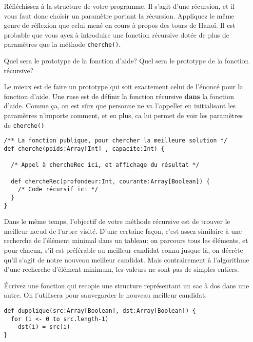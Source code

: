 \documentclass[10pt]{article}\usepackage[correction,nu]{esial}
\begin{document}
\medskip Réfléchissez à la structure de votre programme. Il s'agit d'une
récursion, et il vous faut donc choisir un paramètre portant la
récursion. Appliquez le même genre de réflexion que celui mené en cours à
propos des tours de Hanoï. Il est probable que vous ayez à introduire une
fonction récursive dotée de plus de paramètres que la méthode
\texttt{cherche()}.

\Question Quel sera le prototype de la fonction d'aide? Quel sera le prototype
de la fonction récursive?

\begin{Reponse}
  Le mieux est de faire un prototype qui soit exactement celui de l'énoncé pour
  la fonction d'aide. Une ruse est de définir la fonction récursive
  \textbf{dans} la fonction d'aide. Comme ça, on est sûrs que personne ne va
  l'appeller en initialisant les paramètres n'importe comment, et en plus, ca
  lui permet de voir les paramètres de \texttt{cherche()}
  \begin{Verbatim}
/** La fonction publique, pour chercher la meilleure solution */
def cherche(poids:Array[Int] , capacite:Int) {

  /* Appel à chercheRec ici, et affichage du résultat */
  
  def chercheRec(profondeur:Int, courante:Array[Boolean]) {
    /* Code récursif ici */
  }
}    
  \end{Verbatim}
\end{Reponse}

\medskip Dans le même temps, l'objectif de votre méthode récursive est de
trouver le meilleur nœud de l'arbre visité. D'une certaine façon, c'est assez
similaire à une recherche de l'élément minimal dans un tableau: on parcours tous
les éléments, et pour chacun, s'il est préférable au meilleur candidat connu
jusque là, on décrète qu'il s'agit de notre nouveau meilleur candidat. Mais
contrairement à l'algorithme d'une recherche d'élément minimum, les valeurs ne
sont pas de simples entiers. 

\Question Écrivez une fonction qui recopie une structure représentant un sac à
dos dans une autre. On l'utilisera pour sauvegarder le nouveau meilleur
candidat.

\begin{Reponse}
  \begin{Verbatim}
def dupplique(src:Array[Boolean], dst:Array[Boolean]) {
  for (i <- 0 to src.length-1) 
    dst(i) = src(i)
}    
  \end{Verbatim}
\end{Reponse}
\end{document}
